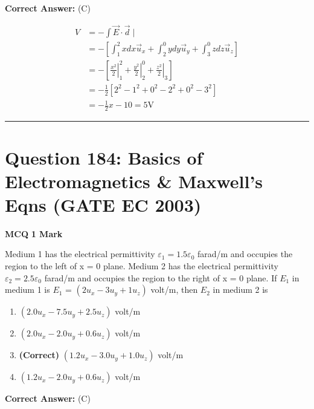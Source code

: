 \documentclass[11pt,a4paper]{article}
\begin{document}
\noindent \textbf{Correct Answer:} (C)

\begin{tcolorbox}[solbox, title=Detailed Solution -- Question 183]
\[
\begin{aligned} V &=-\int \vec{E} \cdot \vec{d} \mid \\ &=-\left[\int_{1}^{2} x d x \vec{u}_{x}+\int_{2}^{0} y d y \vec{u}_{y}+\int_{3}^{0} z d z \vec{u}_{z}\right] \\ &=-\left[\left.\frac{x^{2}}{2}\right|_{1} ^{2}+\left.\frac{y^{2}}{2}\right|_{2} ^{0}+\left.\frac{z^{2}}{2}\right|_{3}\right] \\ &=-\frac{1}{2}\left[2^{2}-1^{2}+0^{2}-2^{2}+0^{2}-3^{2}\right] \\ &=-\frac{1}{2} x-10=5 \mathrm{V} \end{aligned}
\]
\end{tcolorbox}

\vspace{1.5em}
\hrule
\vspace{1.5em}

\section*{Question 184: Basics of Electromagnetics \& Maxwell's Eqns (GATE EC 2003)}
\noindent \textbf{\color{primary}MCQ} \hfill \textbf{\color{secondary}1 Mark}


\noindent Medium 1 has the electrical permittivity $\varepsilon _{1}=1.5\varepsilon _{0}$ farad/m and occupies the region to the left of x = 0 plane. Medium 2 has the electrical permittivity $\varepsilon _{2}=2.5\varepsilon _{0}$ farad/m and occupies the region to the right of x = 0 plane. If $E_{1}$ in medium 1 is $E_{1}$ = $(2u_{x}-3u_{y}+1u_{z})$ volt/m, then  $E_{2}$ in medium 2 is


\begin{enumerate}[label=(\Alph*)]
    \item $(2.0u_{x}-7.5u_{y}+2.5u_{z})$ volt/m
    \item $(2.0u_{x}-2.0u_{y}+0.6u_{z})$ volt/m
    \item \textbf{(Correct)} $(1.2u_{x}-3.0u_{y}+1.0u_{z})$ volt/m
    \item $(1.2u_{x}-2.0u_{y}+0.6u_{z})$ volt/m
\end{enumerate}

\noindent \textbf{Correct Answer:} (C)
\end{document}
